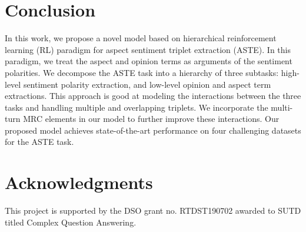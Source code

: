\documentclass[sigconf]{acmart}
\begin{document}
\section{Conclusion}
In this work, we propose a novel \mymodel{} model based on hierarchical reinforcement learning (RL) paradigm for aspect sentiment triplet extraction (ASTE). In this paradigm, we treat the aspect and opinion terms as arguments of the sentiment polarities. We decompose the ASTE task into a hierarchy of three subtasks: high-level sentiment polarity extraction, and low-level opinion and aspect term extractions. This approach is good at modeling the interactions between the three tasks and handling multiple and overlapping triplets. We incorporate the multi-turn MRC elements in our model to further improve these interactions. Our proposed model achieves state-of-the-art performance on four challenging datasets for the ASTE task.

\section*{Acknowledgments}


This project is supported by the DSO grant no. RTDST190702  awarded to SUTD titled Complex Question Answering.





















































































\end{document}
